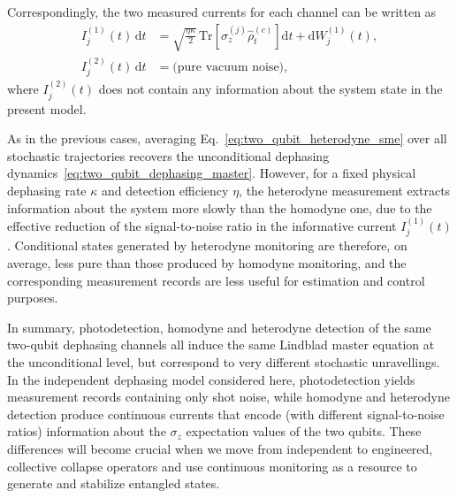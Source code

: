 Correspondingly, the two measured currents for each channel can be written as
\begin{equation}
	\begin{aligned}
		I_j^{(1)}(t)\, \mathrm{d}t
		&= \sqrt{\frac{\eta\kappa}{2}}\, 
		\mathrm{Tr}\!\left[\sigma_z^{(j)} \hat{\rho}_t^{(c)}\right] \mathrm{d}t
		+ \mathrm{d}W_j^{(1)}(t), \\
		I_j^{(2)}(t)\, \mathrm{d}t
		&= \text{(pure vacuum noise)},
	\end{aligned}
	\label{eq:two_qubit_heterodyne_currents}
\end{equation}
where $I_j^{(2)}(t)$ does not contain any information about the system state in the present model.  

As in the previous cases, averaging Eq.~\eqref{eq:two_qubit_heterodyne_sme} over all stochastic trajectories recovers the unconditional dephasing dynamics~\eqref{eq:two_qubit_dephasing_master}.  
However, for a fixed physical dephasing rate $\kappa$ and detection efficiency $\eta$, the heterodyne measurement extracts information about the system more slowly than the homodyne one, due to the effective reduction of the signal-to-noise ratio in the informative current $I_j^{(1)}(t)$.  
Conditional states generated by heterodyne monitoring are therefore, on average, less pure than those produced by homodyne monitoring, and the corresponding measurement records are less useful for estimation and control purposes.

In summary, photodetection, homodyne and heterodyne detection of the same two-qubit dephasing channels all induce the same Lindblad master equation at the unconditional level, but correspond to very different stochastic unravellings.  
In the independent dephasing model considered here, photodetection yields measurement records containing only shot noise, while homodyne and heterodyne detection produce continuous currents that encode (with different signal-to-noise ratios) information about the $\sigma_z$ expectation values of the two qubits.  
These differences will become crucial when we move from independent to engineered, collective collapse operators and use continuous monitoring as a resource to generate and stabilize entangled states.
